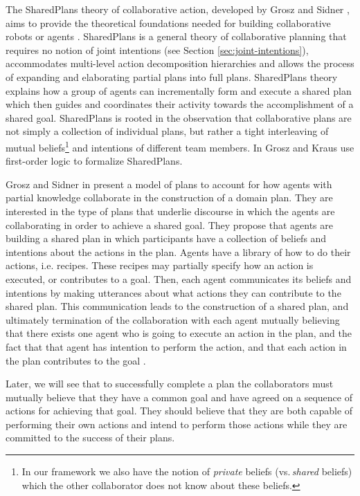 \documentclass[12pt]{report}
\begin{document}
The SharedPlans theory of collaborative action, developed by Grosz and Sidner
\cite{grosz:planning-acting, grosz:collaboration, grosz:plans-discourse}, aims
to provide the theoretical foundations needed for building collaborative
robots or agents \cite{grosz:collaborative-systems}. SharedPlans is a general
theory of collaborative planning that requires no notion of joint intentions
(see Section \ref{sec:joint-intentions}), accommodates multi-level action
decomposition hierarchies and allows the process of expanding and elaborating
partial plans into full plans. SharedPlans theory explains how a group of agents
can incrementally form and execute a shared plan which then guides and
coordinates their activity towards the accomplishment of a shared goal.
SharedPlans is rooted in the observation that collaborative plans are not simply
a collection of individual plans, but rather a tight interleaving of mutual
beliefs\footnote{\color{red}In our framework we also have the notion of
\textit{private} beliefs (vs.\,\textit{shared} beliefs) which the other
collaborator does not know about these beliefs.} and intentions of different
team members. In \cite{grosz:collaboration} Grosz and Kraus use first-order
logic to formalize SharedPlans.

Grosz and Sidner in \cite{grosz:plans-discourse} present a model of plans to
account for how agents with partial knowledge collaborate in the construction of
a domain plan. They are interested in the type of plans that underlie discourse
in which the agents are collaborating in order to achieve a shared goal. They
propose that agents are building a shared plan in which participants have a
collection of beliefs and intentions about the actions in the plan. Agents have
a library of how to do their actions, i.e. recipes. These recipes may partially
specify how an action is executed, or contributes to a goal. Then, each agent
communicates its beliefs and intentions by making utterances about what actions
they can contribute to the shared plan. This communication leads to the
construction of a shared plan, and ultimately termination of the collaboration
with each agent mutually believing that there exists one agent who is going to
execute an action in the plan, and the fact that that agent has intention to
perform the action, and that each action in the plan contributes to the goal
\cite{grosz:plans-discourse} \cite{lochbaum:plan-models}.

Later, we will see that to successfully complete a plan the collaborators must
mutually believe that they have a common goal and have agreed on a sequence of
actions for achieving that goal. They should believe that they are both capable
of performing their own actions and intend to perform those actions while they
are committed to the success of their plans.
\end{document}
